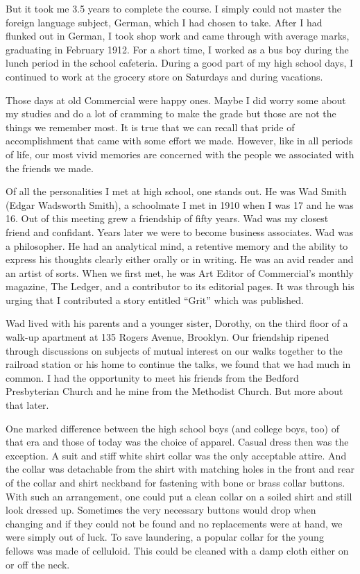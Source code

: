 \documentclass[12pt]{book}              %
\begin{document}
But it took me 3.5 years to complete the course. I simply could not master the foreign language subject, German, which I had chosen to take. After I had flunked out in German, I took shop work and came through with average marks, graduating in February 1912. For a short time, I worked as a bus boy during the lunch period in the school cafeteria. During a good part of my high school days, I continued to work at the grocery store on Saturdays and during vacations. 

Those days at old Commercial were happy ones. Maybe I did worry some about my studies and do a lot of cramming to make the grade but those are not the things we remember most. It is true that we can recall that pride of accomplishment that came with some effort we made. However, like in all periods of life, our most vivid memories are concerned with the people we associated with the friends we made. 

Of all the personalities I met at high school, one stands out. He was Wad Smith (Edgar Wadsworth Smith), a schoolmate I met in 1910 when I was 17 and he was 16. Out of this meeting grew a friendship of fifty years. Wad was my closest friend and confidant. Years later we were to become business associates. Wad was a philosopher. He had an analytical mind, a retentive memory and the ability to express his thoughts clearly either orally or in writing. He was an avid reader and an artist of sorts. When we first met, he was Art Editor of Commercial's monthly magazine, The Ledger, and a contributor to its editorial pages. It was through his urging that I contributed a story entitled ``Grit'' which was published.

Wad lived with his parents and a younger sister, Dorothy, on the third floor of a walk-up apartment at 135 Rogers Avenue, Brooklyn. Our friendship ripened through discussions on subjects of mutual interest on our walks together to the railroad station or his home to continue the talks, we found that we had much in common. I had the opportunity to meet his friends from the Bedford Presbyterian Church and he mine from the Methodist Church. But more about that later.

One marked difference between the high school boys (and college boys, too) of that era and those of today was the choice of apparel. Casual dress then was the exception. A suit and stiff white shirt collar was the only acceptable attire. And the collar was detachable from the shirt with matching holes in the front and rear of the collar and shirt neckband for fastening with bone or brass collar buttons. With such an arrangement, one could put a clean collar on a soiled shirt and still look dressed up. Sometimes the very necessary buttons would drop when changing and if they could not be found and no replacements were at hand, we were simply out of luck. To save laundering, a popular collar for the young fellows was made of celluloid. This could be cleaned with a damp cloth either on or off the neck.
\end{document}
